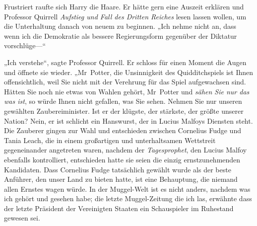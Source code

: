 Frustriert raufte sich Harry die Haare. Er hätte gern eine Auszeit erklären und Professor Quirrell \emph{Aufstieg und Fall des Dritten Reiches} lesen lassen wollen, um die Unterhaltung danach von neuem zu beginnen. „Ich nehme nicht an, dass wenn ich die Demokratie als bessere Regierungsform gegenüber der Diktatur vorschlüge—“

„Ich verstehe“, sagte Professor Quirrell. Er schloss für einen Moment die Augen und öffnete sie wieder. „Mr~Potter, die Unsinnigkeit des Quidditchspiels ist Ihnen offensichtlich, weil Sie nicht mit der Verehrung für das Spiel aufgewachsen sind. Hätten Sie noch nie etwas von Wahlen gehört, Mr~Potter und \emph{sähen Sie nur das was ist}, so würde Ihnen nicht gefallen, was Sie sehen. Nehmen Sie nur unseren gewählten Zaubereiminister. Ist er der klügste, der stärkste, der größte unserer Nation? Nein, er ist schlicht ein Hanswurst, der in Lucius Malfoys Diensten steht. Die Zauberer gingen zur Wahl und entschieden zwischen Cornelius Fudge und Tania Leach, die in einem großartigen und unterhaltsamen Wettstreit gegeneinander angetreten waren, nachdem der \emph{Tagesprophet}, den Lucius Malfoy ebenfalls kontrolliert, entschieden hatte sie seien die einzig ernstzunehmenden Kandidaten. Dass Cornelius Fudge tatsächlich gewählt wurde als der beste Anführer, den unser Land zu bieten hatte, ist eine Behauptung, die niemand allen Ernstes wagen würde. In der Muggel-Welt ist es nicht anders, nachdem was ich gehört und gesehen habe; die letzte Muggel-Zeitung die ich las, erwähnte dass der letzte Präsident der Vereinigten Staaten ein Schauspieler im Ruhestand gewesen sei.%
